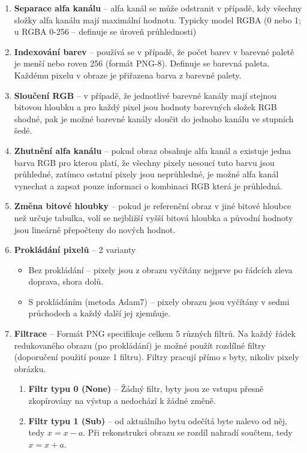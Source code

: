 \begin{enumerate}
    \item \textbf{Separace alfa kanálu} -- alfa kanál se může odstranit v případě, kdy všechny složky alfa kanálu mají maximální hodnotu. Typicky model RGBA (0 nebo 1; u RGBA 0-256 -- definuje se úroveň průhlednosti)
    \item \textbf{Indexování barev} -- používá se v případě, že počet barev v barevné paletě je menší nebo roven 256 (formát PNG-8). Definuje se barevná paleta. Každému pixelu v obraze je přiřazena barva z barevné palety.
    \item \textbf{Sloučení RGB} -- v případě, že jednotlivé barevné kanály mají stejnou bitovou hloubku a pro každý pixel jsou hodnoty barevných složek RGB shodné, pak je možné barevné kanály sloučit do jednoho kanálu ve stupních šedé.
    \item \textbf{Zhutnění alfa kanálu} -- pokud obraz obsahuje alfa kanál a existuje jedna barva RGB pro kterou platí, že všechny pixely nesoucí tuto barvu jsou průhledné, zatímco ostatní pixely jsou neprůhledné, je možné alfa kanál vynechat a zapsat pouze informaci o kombinaci RGB která je průhledná.
    \item \textbf{Změna bitové hloubky} -- pokud je referenční obraz v jiné bitové hloubce než určuje tabulka, volí se nejbližší vyšší bitová hloubka a původní hodnoty jsou lineárně přepočteny do nových hodnot.
    \item \textbf{Prokládání pixelů} -- 2 varianty
        \begin{itemize}
            \item Bez prokládání -- pixely jsou z obrazu vyčítány nejprve po řádcích zleva doprava, shora dolů.
            \item S prokládáním (metoda Adam7) -- pixely obrazu jsou vyčítány v sedmi průchodech a každý další jej zjemňuje.
        \end{itemize}
    \item \textbf{Filtrace} -- Formát PNG specifikuje celkem 5 různých filtrů. Na každý řádek redukovaného obrazu (po prokládání) je možné použít rozdílné filtry (doporučení použití pouze 1 filtru). Filtry pracují přímo s byty, nikoliv pixely obrázku.
        \begin{enumerate}
    \item \textbf{Filtr typu 0 (None)} -- Žádný filtr, byty jsou ze vstupu přesně zkopírovány na výstup a nedochází k žádné změně. 

    \item \textbf{Filtr typu 1 (Sub)} -- od aktuálního bytu odečítá byte nalevo od něj, tedy $x = x - a$. Při rekonstrukci obrazu se rozdíl nahradí součtem, tedy $x = x + a$.


\end{enumerate}
\end{enumerate}
